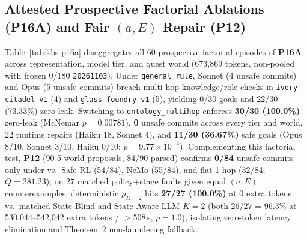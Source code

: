 \subsection{Attested Prospective Factorial Ablations (\textbf{P16A}) and Fair $(a,E)$ Repair (\textbf{P12})}\label{sec:kbs-p16a}
Table~\ref{tab:kbs-p16a} disaggregates all 60 prospective factorial episodes of \textbf{P16A} across representation, model tier, and quest world (673,869 tokens, non-pooled with frozen 0/180 \texttt{20261103}). Under \texttt{general\_rule}, Sonnet (4 unsafe commits) and Opus (5 unsafe commits) breach multi-hop knowledge/role checks in \texttt{ivory-citadel-v1} (4) and \texttt{glass-foundry-v1} (5), yielding 0/30 goals and 22/30 (73.33\%) zero-leak. Switching to \texttt{ontology\_multihop} enforces \textbf{30/30 (100.0\%)} zero-leak (McNemar $p{=}0.00781$), \textbf{0} unsafe commits across every tier and world, 22 runtime repairs (Haiku 18, Sonnet 4), and \textbf{11/30 (36.67\%)} safe goals (Opus 8/10, Sonnet 3/10, Haiku 0/10; $p{=}9.77{\times}10^{-4}$). Complementing this factorial test, \textbf{P12} (90 5-world proposals, 84/90 parsed) confirms \textbf{0/84} unsafe commits only under \system{} vs.\ Safe-RL (54/84), NeMo (55/84), and flat 1-hop (32/84; $Q{=}281.23$); on 27 matched policy+stage faults given equal $(a,E)$ counterexamples, deterministic $\rho_{K=2}$ hits \textbf{27/27 (100.0\%)} at 0 extra tokens vs.\ matched State-Blind and State-Aware LLM $K{=}2$ (both 26/27 = 96.3\% at 530,044--542,042 extra tokens / $>$508\,s, $p{=}1.0$), isolating zero-token latency elimination and Theorem~2 non-laundering fallback.

